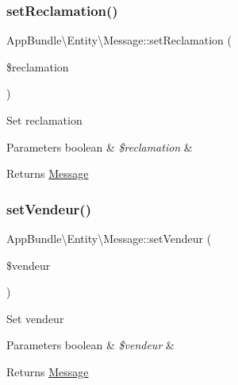 \subsubsection{\texorpdfstring{set\+Reclamation()}{setReclamation()}}
{\footnotesize\ttfamily App\+Bundle\textbackslash{}\+Entity\textbackslash{}\+Message\+::set\+Reclamation (\begin{DoxyParamCaption}\item[{}]{\$reclamation }\end{DoxyParamCaption})}

Set reclamation


\begin{DoxyParams}[1]{Parameters}
boolean & {\em \$reclamation} & \\
\hline
\end{DoxyParams}
\begin{DoxyReturn}{Returns}
\hyperlink{class_app_bundle_1_1_entity_1_1_message}{Message} 
\end{DoxyReturn}
\mbox{\label{class_app_bundle_1_1_entity_1_1_message_a4ec8ec430673bd2b7371f59de1b4b513}} 
\subsubsection{\texorpdfstring{set\+Vendeur()}{setVendeur()}}
{\footnotesize\ttfamily App\+Bundle\textbackslash{}\+Entity\textbackslash{}\+Message\+::set\+Vendeur (\begin{DoxyParamCaption}\item[{}]{\$vendeur }\end{DoxyParamCaption})}

Set vendeur


\begin{DoxyParams}[1]{Parameters}
boolean & {\em \$vendeur} & \\
\hline
\end{DoxyParams}
\begin{DoxyReturn}{Returns}
\hyperlink{class_app_bundle_1_1_entity_1_1_message}{Message} 
\end{DoxyReturn}
\mbox{\label{class_app_bundle_1_1_entity_1_1_message_afc326f8db6bbe6b45f4b6081ad76fbd8}} 
